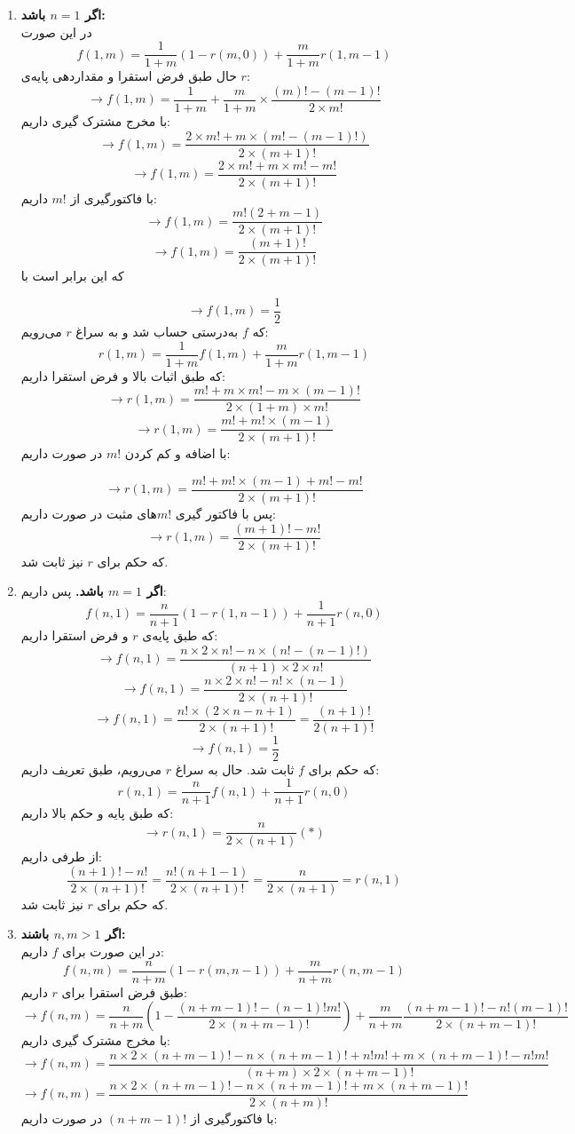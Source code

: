 \documentclass[12pt,a4paper]{article}
\begin{document}
\begin{enumerate}
	\item \textbf{اگر $n = 1$ باشد:}
	\\
	در این صورت 
$$f(1, m) = \frac{1}{1+m}(1-r(m, 0)) + \frac{m}{1+m}r(1, m-1)$$
حال طبق فرض استقرا و مقداردهی پایه‌ی $r$:
$$\rightarrow
f(1, m) = \frac{1}{1+m} + 
\frac{m}{1+m} \times \frac{(m)! - (m-1)!}{2\times m!}
$$
با مخرج مشترک گیری داریم:
$$\rightarrow
f(1, m) = \frac{
	2 \times m! + m \times (m! - (m-1)!)
}{
	2 \times (m+1)!
}
$$
$$\rightarrow
f(1, m) = \frac{
	2 \times m! + m \times m! - m!
}{
	2 \times (m+1)!
}
$$
با فاکتورگیری از $m!$ داریم:
$$\rightarrow
f(1, m) = \frac{
	m!(2 + m - 1)
}{
	2 \times (m+1)!
}
$$
$$\rightarrow
f(1, m) = \frac{
	(m+1)!
}{
	2 \times (m+1)!
}
$$
که این برابر است با

$$\rightarrow
f(1, m) = \frac{1}{2}
$$
که $f$ به‌درستی حساب شد و به سراغ $r$ می‌رویم:
$$
r(1, m) = \frac{1}{1+m} f(1, m) + \frac{m}{1+m} r(1, m-1)
$$
که طبق اثبات بالا و فرض استقرا داریم:
$$
\rightarrow r(1, m) = \frac{
	m! + m\times m! - m \times (m-1)!
}{
	2\times (1+m) \times m!
}
$$
$$
\rightarrow r(1, m) = \frac{
	m! + m!\times (m-1)
}{
	2\times (m+1)!
}
$$
با اضافه و کم کردن $m!$ در صورت داریم:

$$
\rightarrow r(1, m) = \frac{
	m! + m!\times (m-1) + m! - m!
}{
	2\times (m+1)!
}
$$
پس با فاکتور گیری $m!$های مثبت در صورت داریم:
$$
\rightarrow r(1, m) = \frac{
	(m+1)! - m!
}{
	2\times (m+1)!
}
$$
که حکم برای $r$ نیز ثابت شد.
\item
\textbf{اگر $m=1$ باشد.}
پس داریم:
$$f(n, 1) = \frac{n}{n+1}(1-r(1, n-1)) + \frac{1}{n+1}r(n, 0)$$
که طبق پایه‌ی $r$ و فرض استقرا داریم:
$$
\rightarrow f(n, 1) = \frac{
	n \times 2 \times n! - n \times (n!-(n-1)!)
}{
(n+1) \times 2 \times n!
}
$$
$$
\rightarrow f(n, 1) = \frac{
	n \times 2 \times n! - n! \times (n-1)
}{
	2 \times (n+1)!
}
$$
$$
\rightarrow f(n, 1) = \frac{
	n! \times (2\times n - n + 1)
}{
	2 \times (n+1)!
}
= \frac{(n+1)!}{2 (n+1)!}
$$
$$ \rightarrow f(n, 1) = \frac{1}{2}$$
که حکم برای $f$ ثابت شد. حال به سراغ $r$ می‌رویم، طبق تعریف داریم:
$$
r(n, 1) = \frac{n}{n+1} f(n, 1) + \frac{1}{n+1} r(n, 0)
$$
که طبق پایه و حکم بالا داریم:
$$
\rightarrow r(n, 1) = \frac{n}{2\times (n+1)} (*)
$$
از طرفی داریم:
$$
\frac{(n+1)! - n!}{2\times(n+1)!} = 
\frac{n!(n+1 - 1)}{2\times(n+1)!} =
\frac{n}{2\times(n+1)} = r(n, 1)
$$
که حکم برای $r$ نیز ثابت شد.
\item 
\textbf{اگر $n, m > 1$ باشند:}
\\
در این صورت برای $f$ داریم:
$$
f(n, m) = \frac{n}{n+m}(1-r(m, n-1)) + \frac{m}{n+m}r(n, m-1)
$$
طبق فرض استقرا برای $r$ داریم:
$$
\rightarrow f(n, m) = \frac{n}{
	n+m
}(1-\frac{(n+m-1)! - (n-1)!m!}{2\times(n+m-1)!}) + \frac{m}{n+m} \frac{(n+m-1)! - n!(m-1)!}{2\times(n+m-1)!}
$$
با مخرج مشترک گیری داریم:
$$
\rightarrow f(n, m) = \frac{
	n \times 2 \times (n+m-1)! - n \times (n+m-1)! + n!m!
	+ m \times (n+m-1)! - n!m!
}{
	(n+m) \times 2 \times (n+m-1)!
}
$$
$$
\rightarrow f(n, m) = \frac{
	n \times 2 \times (n+m-1)! - n \times (n+m-1)!
	+ m \times (n+m-1)!
}{
	2 \times (n+m)!
}
$$
با فاکتورگیری از $(n+m-1)!$ در صورت داریم:


\end{enumerate}
\end{document}
